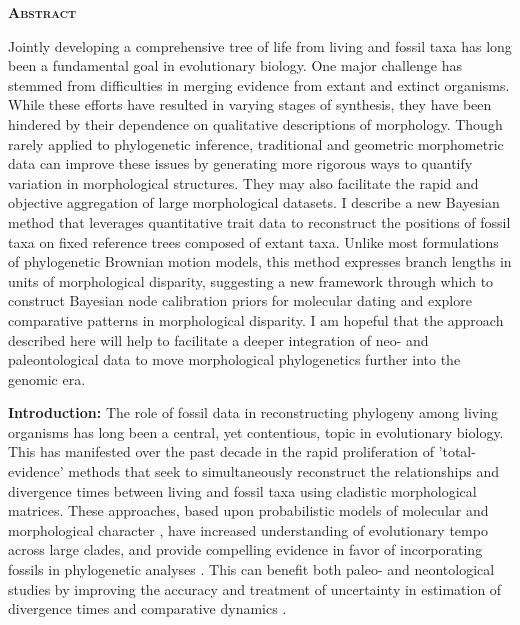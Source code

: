 \documentclass[12pt]{article}
\providecommand{\DIFadd}[1]{{\protect\color{blue}\uwave{#1}}} %
\providecommand{\DIFaddbegin}{} %
\providecommand{\DIFaddend}{} %
\newcommand{\DIFaddincludegraphics}[2][]{{\color{blue}\fbox{\DIFOincludegraphics[#1]{#2}}}} %
\DeclareRobustCommand{\DIFaddbegin}{\DIFOaddbegin \let\includegraphics\DIFaddincludegraphics} %
\DeclareRobustCommand{\DIFaddend}{\DIFOaddend \let\includegraphics\DIFOincludegraphics} %
\begin{document}
\DIFaddbegin \setcounter{page}{1}

\newpage

\DIFaddend \noindent \textbf{\textsc{Abstract}}

Jointly developing a comprehensive tree of life  from living and fossil taxa has long been a fundamental goal in evolutionary biology. One major challenge has stemmed from difficulties in merging evidence  from extant and extinct organisms.  While these efforts	 have resulted in varying stages of synthesis, they have been hindered by their dependence on  qualitative descriptions of morphology. Though rarely applied to phylogenetic inference, traditional and geometric morphometric data can improve these issues by generating more rigorous ways to quantify variation in morphological structures. They may also facilitate the rapid and objective aggregation of large morphological datasets. I describe a new Bayesian method that leverages quantitative trait data to reconstruct the positions of fossil taxa on fixed reference trees composed of extant taxa. Unlike most formulations of phylogenetic Brownian motion models, this method expresses branch lengths in units of morphological disparity, suggesting a new framework through which to construct Bayesian node calibration priors for molecular dating and explore comparative patterns in morphological disparity. I am hopeful that the approach described here will help to facilitate a deeper integration of neo- and paleontological data to move morphological phylogenetics further into the genomic era.

\newpage

\noindent\textbf{Introduction:} The role of fossil data in reconstructing
phylogeny among living organisms has long been a central, yet
contentious, topic in evolutionary biology. This has manifested over the past decade
in the rapid proliferation of 'total-evidence' methods that seek to simultaneously reconstruct the relationships
and divergence times between living and fossil taxa using cladistic morphological matrices.
 These approaches, based upon probabilistic models of molecular and
morphological character \DIFaddbegin \DIFadd{evolution}\DIFaddend , have increased understanding of evolutionary tempo across large clades,
and provide compelling evidence in favor of incorporating fossils in
phylogenetic analyses \citep{pyron2011divergence,ronquist2012total}. This can
 benefit both paleo- and neontological studies by improving the accuracy and treatment of
uncertainty in estimation of divergence times and comparative dynamics \citep{slater2012integrating,guindon2018accounting}.
\end{document}
